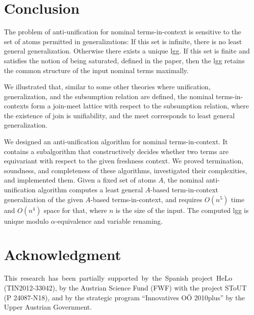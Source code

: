 \documentclass[11pt,a4paper]{amsart}
\theoremstyle{definition}
\begin{document}
\section{Conclusion}
\label{sect:conclusion}

The problem of anti-unification for nominal terms-in-context is
sensitive to the set of atoms permitted in generalizations: If this
set is infinite, there is no least general generalization. Otherwise
there exists a unique lgg. If this set is finite and satisfies the
notion of being saturated, defined in the paper, then the lgg retains
the common structure of the input nominal terms maximally.

We illustrated that, similar to some other theories where unification,
generalization, and the subsumption relation are defined, the nominal
terms-in-contexts form a join-meet lattice with respect to the
subsumption relation, where the existence of join is unifiability, and
the meet corresponds to least general generalization.

We designed an anti-unification algorithm for nominal
terms-in-context. It contains a subalgorithm that constructively
decides whether two terms are equivariant with respect to the given
freshness context. We proved termination, soundness, and completeness
of these algorithms, investigated their complexities, and implemented
them. Given a fixed set of atoms $A$, the nominal anti-unification
algorithm computes a least general $A$-based term-in-context
generalization of the given $A$-based terms-in-context, and requires
$O(n^5)$ time and $O(n^4)$ space for that, where $n$ is the size of
the input. The computed lgg is unique modulo $\alpha$-equivalence and
variable renaming.




\section*{Acknowledgment}

This\, research\, has\, been\, partially\, supported\, by\, the\, Spanish\, project\, HeLo
(TIN2012-33042), by the Austrian
Science Fund (FWF) with the project SToUT (P 24087-N18), and by the strategic program ``Innovatives O\"{O} 2010plus'' by the Upper Austrian Government.
\end{document}
